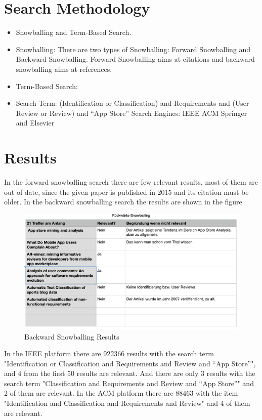 \section{Search Methodology}

\begin{itemize}
\item Snowballing and Term-Based Search.
\item Snowballing: There are two types of Snowballing: Forward Snowballing and Backward Snowballing. Forward Snowballing aims at citations and backward snowballing aims at references.
\item Term-Based Search:
\item Search Term: (Identification or Classification) and Requirements and (User Review or Review) and “App Store”
Search Engines: IEEE ACM Springer and Elsevier
\end{itemize}


\section{Results}
In the forward snowballing search there are few relevant results, most of them are out of date, since the given paper is published in 2015 and its citation must be older.
In the backward snowballing search the results are shown in the figure

\begin{figure}[H] 
\centering
\includegraphics[scale=0.4]{../images/Thema1_BackwardSnowballing.png} 
\caption{Backward Snowballing Results}
\label{fig:model}
\end{figure}

In the IEEE platform there are 922366 results with the search term "Identification or Classification and Requirements and Review and “App Store”", and 4 from the first 50 results are relevant. And there are only 3 results with the search term "Classification and Requirements and Review and “App Store”" and 2 of them are relevant. In the ACM platform there are 88463 with the item "Identification and Classification and Requirements and Review" and 4 of them are relevant. 

